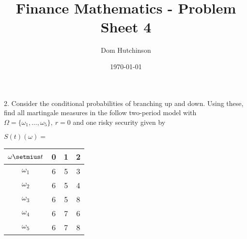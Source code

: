\documentclass[11pt,a4paper]{article}
\begin{document}
\questionsfalse

\title{Finance Mathematics - Problem Sheet 4}
\author{Dom Hutchinson}
\date{\today}
\maketitle


\begin{question}{2.}
  Consider the conditional probabilities of branching up and down. Using these, find all martingale measures in the follow two-period model with $\Omega=\{\omega_1,\dots,\omega_5\},\ r=0$ and one risky security given by
  \begin{center}
    $S(t)(\omega)=$
    \begin{tabular}{c|ccc}
      $\omega\setmius t$&0&1&2\\\hline
      $\omega_1$&6&5&3\\
      $\omega_2$&6&5&4\\
      $\omega_3$&6&5&8\\
      $\omega_4$&6&7&6\\
      $\omega_5$&6&7&8
    \end{tabular}
  \end{center}
\end{question}
\end{document}
